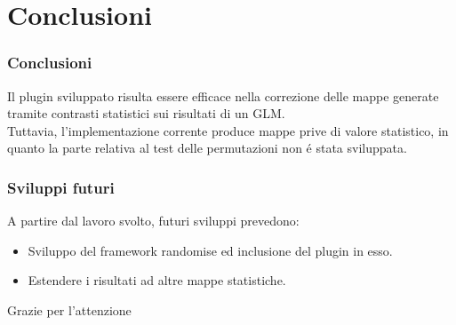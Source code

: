 \documentclass{beamer}
\begin{document}
\section{Conclusioni}
\begin{frame}
\frametitle{Conclusioni}
Il plugin sviluppato risulta essere efficace nella correzione delle mappe generate tramite contrasti statistici sui risultati di un GLM.\\

\bigskip
Tuttavia, l'implementazione corrente produce mappe prive di valore statistico, in quanto la parte relativa al test delle permutazioni non \'e stata sviluppata.
\end{frame}

\begin{frame}
\frametitle{Sviluppi futuri}
A partire dal lavoro svolto, futuri sviluppi prevedono:
\begin{itemize}
\item Sviluppo del framework randomise ed inclusione del plugin in esso.
\item Estendere i risultati ad altre mappe statistiche.
\end{itemize}
\end{frame}

\begin{frame}
\huge{Grazie per l'attenzione}
\end{frame}
\end{document}
